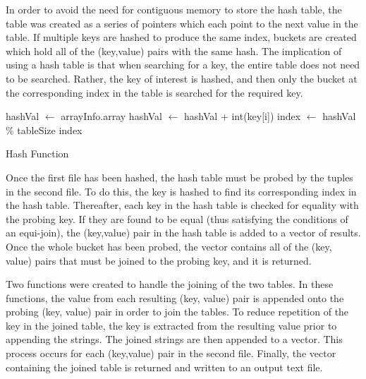 \documentclass[12pt,twocolumn]{witseiepaper}
\begin{document}
In order to avoid the need for contiguous memory to store the hash table, the table was created as a series of pointers which each point to the next value in the table. If multiple keys are hashed to produce the same index, buckets are created which hold all of the (key,value) pairs with the same hash. The implication of using a hash table is that when searching for a key, the entire table does not need to be searched. Rather, the key of interest is hashed, and then only the bucket at the corresponding index in the table is searched for the required key.
{
\begin{algorithm}[htbp]
	\begin{algorithmic}
		\State hashVal $\leftarrow$ arrayInfo.\textunderscore array
		\State hashVal $\leftarrow$ hashVal + int(key[i])
		\EndFor
		\State index $\leftarrow$ hashVal \% tableSize
		\State \Return index \\
		\EndFunction
		\caption{Hash Function}
		\label{alg:2}
	\end{algorithmic}
\end{algorithm}
}
Once the first file has been hashed, the hash table must be probed by the tuples in the second file. To do this, the key is hashed to find its corresponding index in the hash table. Thereafter, each key in the hash table is checked for equality with the probing key. If they are found to be equal (thus satisfying the conditions of an equi-join), the (key,value) pair in the hash table is added to a vector of results. Once the whole bucket has been probed, the vector contains all of the (key, value) pairs that must be joined to the probing key, and it is returned.

Two functions were created to handle the joining of the two tables. In these functions, the value from each resulting (key, value) pair is appended onto the probing (key, value) pair in order to join the tables. To reduce repetition of the key in the joined table, the key is extracted from the resulting value prior to appending the strings. The joined strings are then appended to a vector. This process occurs for each (key,value) pair in the second file. Finally, the vector containing the joined table is returned and written to an output text file.
\end{document}
